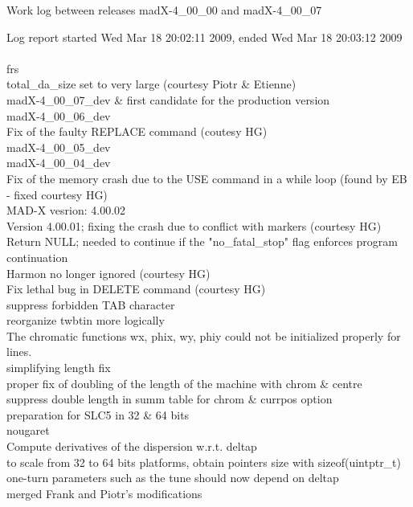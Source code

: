 Work log between releases madX-4\_00\_00 and madX-4\_00\_07 

Log report started Wed Mar 18 20:02:11 2009, ended Wed Mar 18 20:03:12 2009
\\
\\
frs \\ 
total\_da\_size set to very large (courtesy Piotr \& Etienne)  \\ 
madX-4\_00\_07\_dev \& first candidate for the production version  \\ 
madX-4\_00\_06\_dev  \\ 
Fix of the faulty REPLACE command (coutesy HG)  \\ 
madX-4\_00\_05\_dev  \\ 
madX-4\_00\_04\_dev  \\ 
Fix of the memory crash due to the USE command in a while loop (found by EB - fixed courtesy HG)  \\ 
MAD-X vesrion: 4.00.02  \\ 
Version 4.00.01; fixing the crash due to conflict with markers (courtesy HG)  \\ 
Return NULL; needed to continue if the "no\_fatal\_stop" flag enforces program continuation  \\ 
Harmon no longer ignored (courtesy HG)  \\ 
Fix lethal bug in DELETE command (courtesy HG)  \\ 
suppress forbidden TAB character  \\ 
reorganize twbtin more logically  \\ 
The chromatic functions wx, phix, wy, phiy could not be initialized properly for lines.  \\ 
simplifying length fix  \\ 
proper fix of doubling of the length of the machine with chrom \& centre  \\ 
suppress double length in summ table for chrom \& currpos option  \\ 
preparation for SLC5 in 32 \& 64 bits  \\ 
nougaret \\ 
Compute derivatives of the dispersion w.r.t. deltap  \\ 
to scale from 32 to 64 bits platforms, obtain pointers size with sizeof(uintptr\_t)  \\ 
one-turn parameters such as the tune should now depend on deltap  \\ 
merged Frank and Piotr's modifications  \\ 
